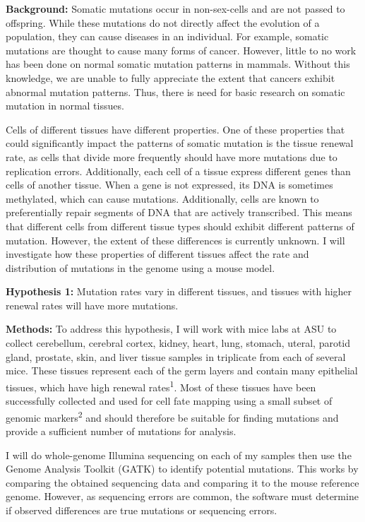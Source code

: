 \documentclass[12pt]{article}
\begin{document}
\noindent
\textbf{Background:}
Somatic mutations occur in non-sex-cells and are not passed to offspring.
While these mutations do not directly affect the evolution of a population, they can cause diseases in an individual.
For example, somatic mutations are thought to cause many forms of cancer.
However, little to no work has been done on normal somatic mutation patterns in mammals.
Without this knowledge, we are unable to fully appreciate the extent that cancers exhibit abnormal mutation patterns.
Thus, there is need for basic research on somatic mutation in normal tissues.

Cells of different tissues have different properties.
One of these properties that could significantly impact the patterns of somatic mutation is the tissue renewal rate, as cells that divide more frequently should have more mutations due to replication errors.
Additionally, each cell of a tissue express different genes than cells of another tissue.
When a gene is not expressed, its DNA is sometimes methylated, which can cause mutations.
Additionally, cells are known to preferentially repair segments of DNA that are actively transcribed.
This means that different cells from different tissue types should exhibit different patterns of mutation.
However, the extent of these differences is currently unknown.
I will investigate how these properties of different tissues affect the rate and distribution of mutations in the genome using a mouse model.

\textbf{Hypothesis 1:}
Mutation rates vary in different tissues, and tissues with higher renewal rates will have more mutations.

\textbf{Methods:}
To address this hypothesis, I will work with mice labs at ASU to collect cerebellum, cerebral cortex, kidney, heart, lung, stomach, uteral, parotid gland, prostate, skin, and liver tissue samples in triplicate from each of several mice.
These tissues represent each of the germ layers and contain many epithelial tissues, which have high renewal rates\textsuperscript{1}.
Most of these tissues have been successfully collected and used for cell fate mapping using a small subset of genomic markers\textsuperscript{2} and should therefore be suitable for finding mutations and provide a sufficient number of mutations for analysis.

I will do whole-genome Illumina sequencing on each of my samples then use the Genome Analysis Toolkit (GATK) to identify potential mutations.
This works by comparing the obtained sequencing data and comparing it to the mouse reference genome.
However, as sequencing errors are common, the software must determine if observed differences are true mutations or sequencing errors.
\end{document}
